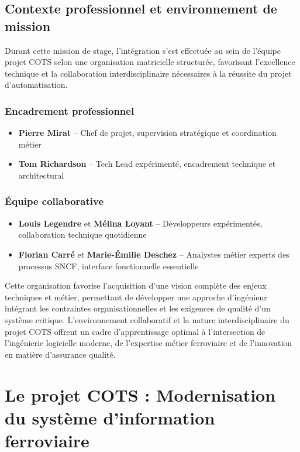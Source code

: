 \subsection{Contexte professionnel et environnement de mission}

Durant cette mission de stage, l'intégration s'est effectuée au sein de l'équipe projet COTS selon une organisation matricielle structurée, favorisant l'excellence technique et la collaboration interdisciplinaire nécessaires à la réussite du projet d'automatisation.

\subsubsection{Encadrement professionnel}
\begin{itemize}
    \item \textbf{Pierre Mirat} -- Chef de projet, supervision stratégique et coordination métier
    \item \textbf{Tom Richardson} -- Tech Lead expérimenté, encadrement technique et architectural
\end{itemize}

\subsubsection{Équipe collaborative}
\begin{itemize}
    \item \textbf{Louis Legendre} et \textbf{Mélina Loyant} -- Développeurs expérimentés, collaboration technique quotidienne
    \item \textbf{Florian Carré} et \textbf{Marie-Émilie Deschez} -- Analystes métier experts des processus SNCF, interface fonctionnelle essentielle
\end{itemize}

Cette organisation favorise l'acquisition d'une vision complète des enjeux techniques et métier, permettant de développer une approche d'ingénieur intégrant les contraintes organisationnelles et les exigences de qualité d'un système critique. L'environnement collaboratif et la nature interdisciplinaire du projet COTS offrent un cadre d'apprentissage optimal à l'intersection de l'ingénierie logicielle moderne, de l'expertise métier ferroviaire et de l'innovation en matière d'assurance qualité.

\section{Le projet COTS : Modernisation du système d'information ferroviaire}

